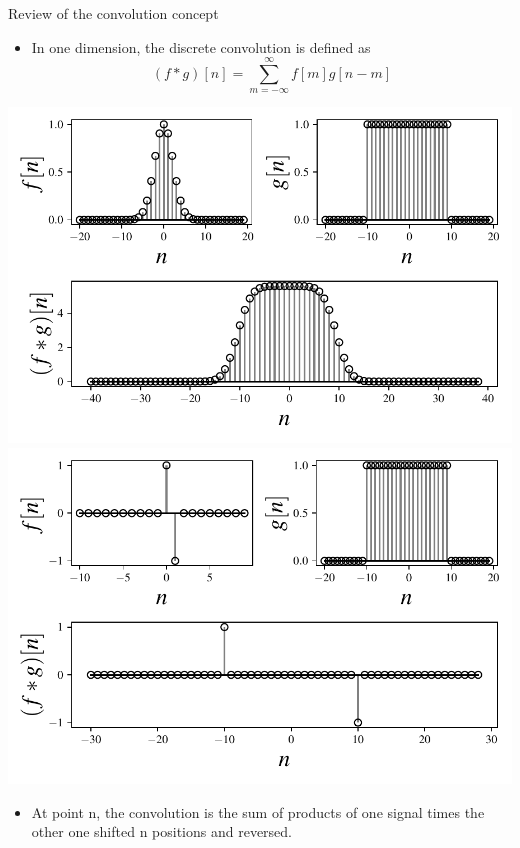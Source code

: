 \documentclass{beamer}
\begin{document}
\begin{frame}{Review of the convolution concept}
\begin{itemize}
    \item In one dimension, the discrete convolution is defined as
    \begin{equation}\label{eq:convolution}
    \left(f*g\right)[n] = \sum_{m=-\infty}^\infty f[m]g[n-m]
\end{equation}
\end{itemize}
\begin{center}
\includegraphics[scale=0.3]{Module 4 (CNN)/pics/ex_convolution_lpfilter.pdf}
\includegraphics[scale=0.3]{Module 4 (CNN)/pics/ex_convolution_derivative.pdf}
\end{center}
\begin{itemize}
    \item At point n, the convolution is the sum of products of one signal times the other one shifted n positions and reversed.
\end{itemize}
\end{frame}
\end{document}
